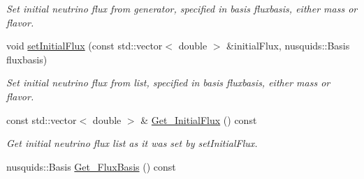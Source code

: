 \begin{DoxyCompactItemize}
\begin{DoxyCompactList}\small\item\em Set initial neutrino flux from generator, specified in basis fluxbasis, either mass or flavor. \end{DoxyCompactList}\item 
void \hyperlink{structcudanusquids_1_1ParameterObject_aa6ddf842498f3507176ee3e291a23f92}{set\+Initial\+Flux} (const std\+::vector$<$ double $>$ \&initial\+Flux, nusquids\+::\+Basis fluxbasis)
\begin{DoxyCompactList}\small\item\em Set initial neutrino flux from list, specified in basis fluxbasis, either mass or flavor. \end{DoxyCompactList}\item 
const std\+::vector$<$ double $>$ \& \hyperlink{structcudanusquids_1_1ParameterObject_aded30b29a3a6ce5971e546caeb33c821}{Get\+\_\+\+Initial\+Flux} () const \hypertarget{structcudanusquids_1_1ParameterObject_aded30b29a3a6ce5971e546caeb33c821}{}\label{structcudanusquids_1_1ParameterObject_aded30b29a3a6ce5971e546caeb33c821}

\begin{DoxyCompactList}\small\item\em Get initial neutrino flux list as it was set by set\+Initial\+Flux. \end{DoxyCompactList}\item 
nusquids\+::\+Basis \hyperlink{structcudanusquids_1_1ParameterObject_acdc41e067bc0e80a5499bc621133837e}{Get\+\_\+\+Flux\+Basis} () const \hypertarget{structcudanusquids_1_1ParameterObject_acdc41e067bc0e80a5499bc621133837e}{}\label{structcudanusquids_1_1ParameterObject_acdc41e067bc0e80a5499bc621133837e}


\end{DoxyCompactItemize}
